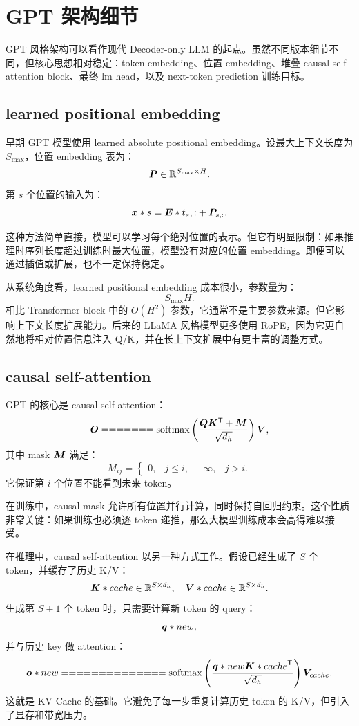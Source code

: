 \section{GPT 架构细节}
\label{sec:gpt-architecture-details}

GPT 风格架构可以看作现代 Decoder-only LLM 的起点。虽然不同版本细节不同，但核心思想相对稳定：token embedding、位置 embedding、堆叠 causal self-attention block、最终 lm head，以及 next-token prediction 训练目标。

\subsection{learned positional embedding}
\label{subsec:gpt-learned-positional-embedding}

早期 GPT 模型使用 learned absolute positional embedding。设最大上下文长度为 $S_{\max}$，位置 embedding 表为：
\[
\bm{P}\in\mathbb{R}^{S_{\max}\times H}.
\]
第 $s$ 个位置的输入为：
\[
\bm{x}*s=\bm{E}*{t_s,:}+\bm{P}_{s,:}.
\]

这种方法简单直接，模型可以学习每个绝对位置的表示。但它有明显限制：如果推理时序列长度超过训练时最大位置，模型没有对应的位置 embedding。即便可以通过插值或扩展，也不一定保持稳定。

从系统角度看，learned positional embedding 成本很小，参数量为：
\[
S_{\max}H.
\]
相比 Transformer block 中的 $O(H^2)$ 参数，它通常不是主要参数来源。但它影响上下文长度扩展能力。后来的 LLaMA 风格模型更多使用 RoPE，因为它更自然地将相对位置信息注入 Q/K，并在长上下文扩展中有更丰富的调整方式。

\subsection{causal self-attention}
\label{subsec:gpt-causal-self-attention}

GPT 的核心是 causal self-attention：
\[
\mat{O}
=======

\softmax
\left(
\frac{\mat{Q}\mat{K}^{\mathsf{T}}+\mat{M}}{\sqrt{d_h}}
\right)
\mat{V},
\]
其中 mask $\bm{M}$ 满足：
\[
M_{ij}=
\begin{cases}
0, & j\le i,\
-\infty, & j>i.
\end{cases}
\]
它保证第 $i$ 个位置不能看到未来 token。

在训练中，causal mask 允许所有位置并行计算，同时保持自回归约束。这个性质非常关键：如果训练也必须逐 token 递推，那么大模型训练成本会高得难以接受。

在推理中，causal self-attention 以另一种方式工作。假设已经生成了 $S$ 个 token，并缓存了历史 K/V：
\[
\bm{K}*{cache}\in\mathbb{R}^{S\times d_h},
\quad
\bm{V}*{cache}\in\mathbb{R}^{S\times d_h}.
\]
生成第 $S+1$ 个 token 时，只需要计算新 token 的 query：
\[
\bm{q}*{new},
\]
并与历史 key 做 attention：
\[
\vect{o}*{new}
==============

\softmax
\left(
\frac{\vect{q}*{new}\mat{K}*{cache}^{\mathsf{T}}}{\sqrt{d_h}}
\right)
\mat{V}_{cache}.
\]
这就是 KV Cache 的基础。它避免了每一步重复计算历史 token 的 K/V，但引入了显存和带宽压力。

